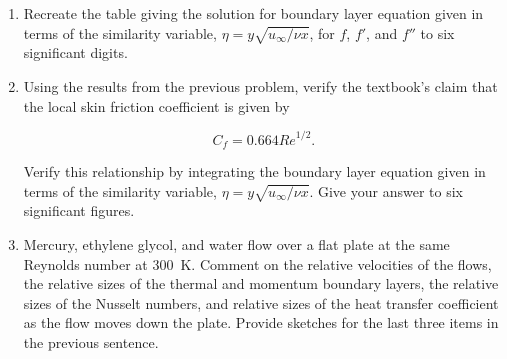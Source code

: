 \documentclass[12pt,letterpaper]{article}
\begin{document}
\begin{enumerate}
    \item Recreate the table giving the solution for boundary layer equation given in terms of the similarity variable, $\eta = y \sqrt{u_\infty / \nu x}$, for $f$, $f'$, and $f''$ to six significant digits.

    \item Using the results from the previous problem, verify the textbook's claim that the local skin friction coefficient is given by

    \begin{equation*}
        C_f = 0.664 \mathit{Re}^{1 / 2}.
    \end{equation*}

    Verify this relationship by integrating the boundary layer equation given in terms of the similarity variable, $\eta = y \sqrt{u_\infty / \nu x}$.
    Give your answer to six significant figures.
    
    \item Mercury, ethylene glycol, and water flow over a flat plate at the same Reynolds number at \SI{300}{\kelvin}.
    Comment on the relative velocities of the flows, the relative sizes of the thermal and momentum boundary layers, the relative sizes of the Nusselt numbers, and relative sizes of the heat transfer coefficient as the flow moves down the plate.
    Provide sketches for the last three items in the previous sentence.

\end{enumerate}
\end{document}
